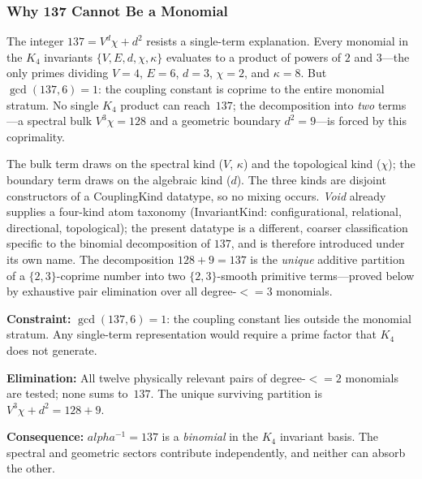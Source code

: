 \documentclass[11pt,a4paper]{book}
\def\alpha{alpha}%
\def\leq{<=}%
\def\texttt#1{#1}%
\begin{document}
\subsubsection*{Why 137 Cannot Be a Monomial}

The integer $137 = V^d \chi + d^2$ resists a single-term explanation.
Every monomial in the $K_4$ invariants $\{V, E, d, \chi, \kappa\}$
evaluates to a product of powers of $2$ and $3$---the only primes
dividing $V = 4$, $E = 6$, $d = 3$, $\chi = 2$, and
$\kappa = 8$.  But $\gcd(137, 6) = 1$: the coupling constant
is coprime to the entire monomial stratum.  No single $K_4$ product
can reach~$137$; the decomposition into \emph{two} terms---a spectral
bulk $V^3 \chi = 128$ and a geometric boundary $d^2 = 9$---is
forced by this coprimality.

The bulk term draws on the spectral kind ($V$, $\kappa$) and
the topological kind ($\chi$); the boundary term draws on the
algebraic kind ($d$).  The three kinds are disjoint constructors
of a \texttt{CouplingKind} datatype, so no mixing occurs.
\textit{Void} already supplies a four-kind atom taxonomy
(\texttt{InvariantKind}: configurational, relational, directional,
topological); the present datatype is a different, coarser
classification specific to the binomial decomposition of $137$,
and is therefore introduced under its own name.
The decomposition $128 + 9 = 137$ is the \emph{unique} additive
partition of a $\{2,3\}$-coprime number into two $\{2,3\}$-smooth
primitive terms---proved below by exhaustive pair elimination over
all degree-$\leq 3$ monomials.

\textbf{Constraint:}
$\gcd(137, 6) = 1$: the coupling constant lies outside the monomial
stratum.  Any single-term representation would require a prime
factor that $K_4$ does not generate.

\textbf{Elimination:}
All twelve physically relevant pairs of degree-$\leq 2$ monomials
are tested; none sums to~$137$.  The unique surviving partition is
$V^3 \chi + d^2 = 128 + 9$.

\textbf{Consequence:}
$\alpha^{-1} = 137$ is a \emph{binomial} in the $K_4$ invariant
basis.  The spectral and geometric sectors contribute independently,
and neither can absorb the other.
\end{document}
